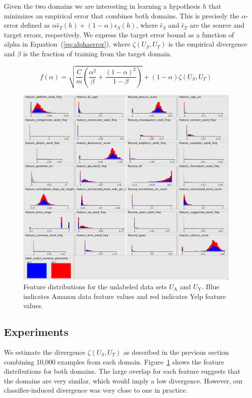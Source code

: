 \documentclass[letterpaper]{article}
\begin{document}
Given the two domains we are interesting in learning a hypothesis $h$
that minimizes an empirical error that combines both domains. This is
precisely the $\alpha$-error defined as $\alpha \hat
\epsilon_T(h)+(1-\alpha)\hat \epsilon_S(h)$, where $\hat \epsilon_S$
and $\hat \epsilon_T$ are the source and target errors,
respectively.  We express the target error bound as a function of alpha in 
Equation~(\ref{eq:alphaerror}), where $\zeta(U_S,U_T)$ is the
empirical divergence and $\beta$ is the fraction of training from the target
domain.

\begin{equation}
  \label{eq:alphaerror}
  f(\alpha)=\sqrt{\frac{C}{m}\left(\frac{\alpha^2}{\beta} + \frac{(1-\alpha)^2}{1-\beta}\right)}+(1-\alpha)\zeta(U_S,U_T)
\end{equation}

\begin{figure}[h]
	\centering
	\includegraphics[width=0.65\linewidth]{adaptation_unlabeled_features}
	\caption{Feature distributions for the unlabeled data sets $U_{\textrm{A}}$ and $U_{\textrm{Y}}$.  
	Blue indicates Amazon data feature values and red indicates Yelp feature values.}
      \label{fig:dist}
\end{figure}

\subsection{Experiments}
\label{sec:domain-adaptation}

We estimate the divergence $\zeta(U_S,U_T)$ as described in the
previous section combining 10,000 examples from each
domain. Figure~\ref{fig:dist} shows the feature distributions for both
domains. The large overlap for each feature suggests that the domains are 
very similar, which would imply a low divergence. However, our 
classifier-induced divergence was very close to one in practice.
\end{document}
